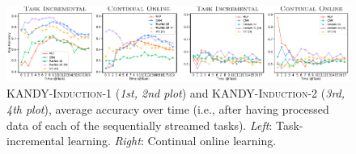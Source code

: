 \begin{figure}[!ht]

	\centering
	\includegraphics[width=1.0\textwidth]{imgs/kandy/Fig7.pdf}
	\caption[Average accuracy over time on \textsc{KANDY-Induction-1}]{\textsc{KANDY-Induction-1} ({\it 1st, 2nd plot}) and \textsc{KANDY-Induction-2} ({\it 3rd, 4th plot}), average accuracy over time (i.e., after having processed data of each of the sequentially streamed tasks). {\it Left}: Task-incremental learning. {\it Right}: Continual online learning.}
	\label{kandy:fig:time_acc_easy_hard}
\end{figure}

